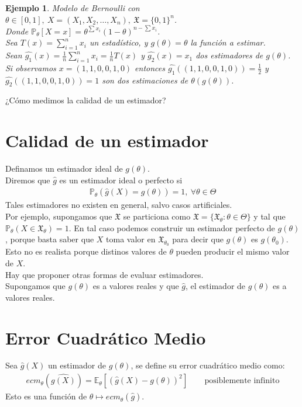 \documentclass[10pt]{article}
\theoremstyle{plain}
\newtheorem{ej}{Ejemplo}
\theoremstyle{definition}
\begin{document}
\begin{ej} Modelo de Bernoulli con $\theta \in \left[0,1\right],\ X = (X_{1}, X_{2}, \ldots, X_{n}),\ \mathfrak{X} = \{0,1\}^n$.\\
Donde $\mathbb{P}_{\theta}\left[X=x\right] = \theta^{\sum{x_{i}}}(1-\theta)^{n-\sum{x_{i}}}$.\\
Sea $T(x) = \sum_{i=1}^n{x_{i}}$ un estadístico, y $g(\theta) = \theta$ la función a estimar.\\

Sean $\hat{g_{1}}(x) = \frac{1}{n}\sum_{i=1}^n{x_{i}} = \frac{1}{n}T(x)$ y $\hat{g_{2}}(x) = x_{1}$ dos estimadores de $g(\theta)$.\\
Si observamos $x=(1,1,0,0,1,0)$ entonces $\hat{g_{1}}((1,1,0,0,1,0)) = \frac{1}{2}$ y $\hat{g_{2}}((1,1,0,0,1,0)) = 1$ son dos estimaciones de $\theta (g(\theta))$.\\
\end{ej}
¿Cómo medimos la calidad de un estimador?

\section{Calidad de un estimador}
Definamos un estimador ideal de $g(\theta)$.\\
 Diremos que $\hat{g}$ es un estimador ideal o perfecto si
 \begin{align*}
 \mathbb{P}_{\theta}(\hat{g}(X) = g(\theta)) = 1,\ \forall \theta \in \Theta
 \end{align*}
Tales estimadores no existen en general, salvo casos artificiales.\\

Por ejemplo, supongamos que $\mathfrak{X}$ se particiona como $\mathfrak{X} = \{\mathfrak{X}_{\theta}\colon \theta \in \Theta\}$ y tal que $\mathbb{P}_{\theta}(X \in \mathfrak{X}_{\theta}) = 1$. En tal caso podemos construir un estimador perfecto de $g(\theta)$, porque basta saber que $X$ toma valor en $\mathfrak{X}_{\theta_{0}}$ para decir que $g(\theta)$ es $g(\theta_{0})$.\\
Esto no es realista porque distinos valores de $\theta$ pueden producir el mismo valor de $X$.\\
Hay que proponer otras formas de evaluar estimadores.\\
Supongamos que $g(\theta)$ es a valores reales y que $\hat{g}$, el estimador de $g(\theta)$ es a valores reales.

\section{Error Cuadrático Medio}
Sea $\hat{g}(X)$ un estimador de $g(\theta)$, se define su error cuadrático medio como:
\begin{align*}
ecm_{\theta}(\hat{g(X)}) = \mathbb{E}_{\theta}\left[(\hat{g}(X) - g(\theta))^2\right]\ &\quad \text{posiblemente infinito}
\end{align*}
Esto es una función de $\theta \mapsto ecm_{\theta}(\hat{g})$.\\
\end{document}
